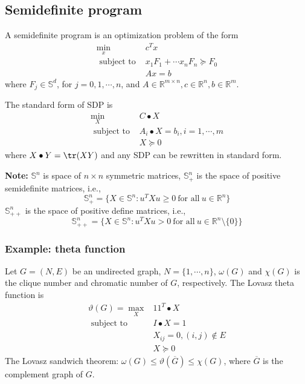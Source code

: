\documentclass[a4paper]{article}
\begin{document}
{\subsection{Semidefinite program}
\begin{defi}
  A semidefinite program is an optimization problem of the form
  \[
  \begin{array}{ll}
      \min\limits_{x} & c^T x \\
      \text { subject to } & x_1 F_1 + \cdots x_n F_n \succeq F_0 \\ \nonumber
      & Ax = b
  \end{array} 
  \]
  where $F_j \in \mathbb{S}^d$, for $j = 0,1,\cdots, n$, and $A \in \mathbb{R}^{m \times n}, c \in \mathbb{R}^{n}, b \in \mathbb{R}^{m}$.
\end{defi}

\noindent The standard form of SDP is 
\begin{equation}
  \begin{array}{ll}
    \min\limits_{X} & C \bullet X \\
    \text { subject to } & A_i \bullet X = b_i, i= 1,\cdots, m \\ \nonumber
    &X \succeq 0
\end{array} 
\end{equation}
where $X \bullet Y  = \tr (XY)$ and any SDP can be rewritten in standard form.

\noindent \textbf{Note:} $\mathbb{S}^n$ is space of $n \times n$ symmetric matrices, $\mathbb{S}^n_+$ is the space of positive semidefinite matrices, i.e.,
\begin{equation}
  \mathbb{S}^n_+ = \{ X \in \mathbb{S}^n : u^TXu \geq 0 \ \text{for all} \ u \in \mathbb{R}^n \} \nonumber
\end{equation}
$\mathbb{S}^n_{++}$ is the space of positive define matrices, i.e.,
\begin{equation}
  \mathbb{S}^n_{++} = \{ X \in \mathbb{S}^n : u^TXu > 0 \ \text{for all} \ u \in \mathbb{R}^n \setminus \{ 0\} \} \nonumber
\end{equation}

\subsubsection{Example: theta function}
Let $G = (N, E)$ be an undirected graph, $N = \{1,\cdots, n\}$, $\omega(G)$ and $\chi (G)$ is the clique number and chromatic number of $G$, respectively. The Lovasz theta function is 
\begin{equation}
  \begin{array}{ll}
    \vartheta (G) = \max\limits_{X} & 11^T \bullet X \\
    \text { subject to } & I \bullet X = 1\\ \nonumber
    & X_{ij} = 0, (i,j) \notin E \\
    & X \succeq 0
\end{array} 
\end{equation}
The Lovasz sandwich theorem: $\omega(G) \leq \vartheta(\overline{G}) \leq \chi (G)$, where $\overline{G} $ is the complement graph of $G$.

}
\end{document}
